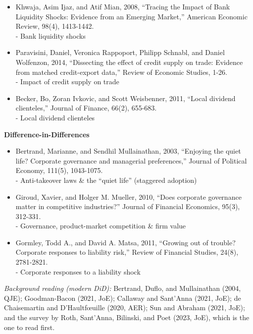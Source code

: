 \documentclass[11pt, a4paper]{article}
\begin{document}
\begin{itemize}
	\item Khwaja, Asim Ijaz, and Atif Mian, 2008, ``Tracing the Impact of Bank Liquidity Shocks:
	Evidence from an Emerging Market,'' American Economic Review, 98(4), 1413-1442.\\
	- Bank liquidity shocks

	\item Paravisini, Daniel, Veronica Rappoport, Philipp Schnabl, and Daniel Wolfenzon, 2014,
	``Dissecting the effect of credit supply on trade: Evidence from matched credit-export
	data,'' Review of Economic Studies, 1-26. \\
	- Impact of credit supply on trade

	\item Becker, Bo, Zoran Ivkovic, and Scott Weisbenner, 2011, ``Local dividend clienteles,''
	Journal of Finance, 66(2), 655-683. \\
	- Local dividend clienteles
\end{itemize}

\noindent\textbf{Difference-in-Differences}

\begin{itemize}
	\item Bertrand, Marianne, and Sendhil Mullainathan, 2003, ``Enjoying the quiet life? Corporate governance and managerial preferences,'' Journal of Political Economy, 111(5), 1043-1075. \\
	- Anti-takeover laws \& the ``quiet life'' (staggered adoption)

	\item Giroud, Xavier, and Holger M. Mueller, 2010, ``Does corporate governance matter in competitive industries?'' Journal of Financial Economics, 95(3), 312-331. \\
	- Governance, product-market competition \& firm value

	\item Gormley, Todd A., and David A. Matsa, 2011, ``Growing out of trouble? Corporate responses to liability risk,'' Review of Financial Studies, 24(8), 2781-2821. \\
	- Corporate responses to a liability shock
\end{itemize}

\noindent\textit{Background reading (modern DiD):} Bertrand, Duflo, and Mullainathan (2004, QJE); Goodman-Bacon (2021, JoE); Callaway and Sant'Anna (2021, JoE); de Chaisemartin and D'Haultf\oe uille (2020, AER); Sun and Abraham (2021, JoE); and the survey by Roth, Sant'Anna, Bilinski, and Poet (2023, JoE), which is the one to read first.
\end{document}
